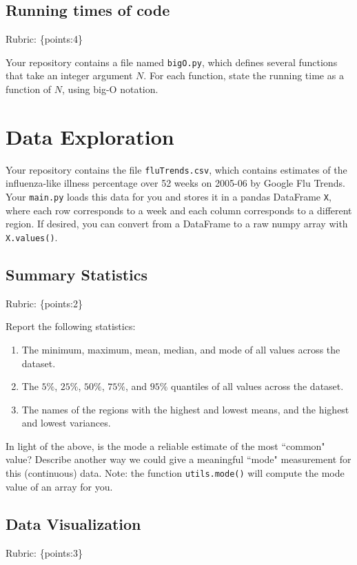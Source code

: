 \documentclass{article}
\def\rubric#1{\gre{Rubric: \{#1\}}}{}
\def\blu#1{{\color{blu}#1}}
\def\gre#1{{\color{gre}#1}}
\begin{document}
	\subsection{Running times of code}
	\rubric{points:4}

	Your repository contains a file named \texttt{bigO.py}, which defines several functions
	that take an integer argument $N$. For each function, \blu{state the running time as a function of $N$, using big-O notation}.

	\section{Data Exploration}


	Your repository contains the file \texttt{fluTrends.csv}, which contains estimates
	of the influenza-like illness percentage over 52 weeks on 2005-06 by Google Flu Trends.
	Your \texttt{main.py} loads this data for you and stores it in a pandas DataFrame \texttt{X},
	where each row corresponds to a week and each column
	corresponds to a different
	region. If desired, you can convert from a DataFrame to a raw numpy array with \texttt{X.values()}.

	\subsection{Summary Statistics}
	\rubric{points:2}

	\blu{Report the following statistics}:
	\begin{enumerate}
		\item The minimum, maximum, mean, median, and mode of all values across the dataset.
		\item The $5\%$, $25\%$, $50\%$, $75\%$, and $95\%$ quantiles of all values across the dataset.
		\item The names of the regions with the highest and lowest means, and the highest and lowest variances.
	\end{enumerate}
	In light of the above, \blu{is the mode a reliable estimate of the most ``common" value? Describe another way we could give a meaningful ``mode" measurement for this (continuous) data.} Note: the function \texttt{utils.mode()} will compute the mode value of an array for you.




	\subsection{Data Visualization}
	\rubric{points:3}
\end{document}

